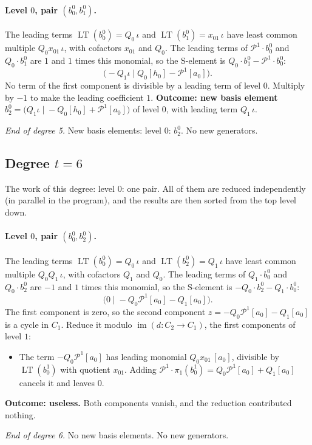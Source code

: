 \documentclass[11pt]{article}
\renewcommand{\P}{\mathcal{P}}
\DeclareMathOperator{\LT}{LT}
\begin{document}
\paragraph{Level $0$, pair $(b^{0}_{0}, b^{0}_{1})$.} The leading terms $\LT(b^{0}_{0}) = Q_{0}\,\iota$ and $\LT(b^{0}_{1}) = x_{01}\,\iota$ have least common multiple $Q_{0}x_{01}\,\iota$, with cofactors $x_{01}$ and $Q_{0}$.
The leading terms of $\P^{1}\cdot b^{0}_{0}$ and $Q_{0}\cdot b^{0}_{1}$ are $1$ and $1$ times this monomial, so the S-element is $Q_{0}\cdot b^{0}_{1} - \P^{1}\cdot b^{0}_{0}$:
\[\bigl(-Q_{1}\iota \;\big|\; Q_{0}[h_0] - \P^{1}[a_0]\bigr).\]
No term of the first component is divisible by a leading term of level $0$.
Multiply by $-1$ to make the leading coefficient $1$.
\textbf{Outcome: new basis element} $b^{0}_{2} = \bigl(Q_{1}\iota \;\big|\; -Q_{0}[h_0] + \P^{1}[a_0]\bigr)$ of level $0$, with leading term $Q_{1}\,\iota$.
\medskip
\par\noindent\emph{End of degree 5.} New basis elements: level $0$: $b^{0}_{2}$. No new generators.
\subsection*{Degree $t = 6$}
\noindent The work of this degree: level $0$: one pair. All of them are reduced independently (in parallel in the program), and the results are then sorted from the top level down.
\medskip
\paragraph{Level $0$, pair $(b^{0}_{0}, b^{0}_{2})$.} The leading terms $\LT(b^{0}_{0}) = Q_{0}\,\iota$ and $\LT(b^{0}_{2}) = Q_{1}\,\iota$ have least common multiple $Q_{0}Q_{1}\,\iota$, with cofactors $Q_{1}$ and $Q_{0}$.
The leading terms of $Q_{1}\cdot b^{0}_{0}$ and $Q_{0}\cdot b^{0}_{2}$ are $-1$ and $1$ times this monomial, so the S-element is $-Q_{0}\cdot b^{0}_{2} - Q_{1}\cdot b^{0}_{0}$:
\[\bigl(0 \;\big|\; -Q_{0}\P^{1}[a_0] - Q_{1}[a_0]\bigr).\]
The first component is zero, so the second component $z = -Q_{0}\P^{1}[a_0] - Q_{1}[a_0]$ is a cycle in $C_{1}$.
Reduce it modulo $\operatorname{im}(d\colon C_{2}\to C_{1})$, the first components of level $1$:
\begin{itemize}
\item The term $-Q_{0}\P^{1}[a_0]$ has leading monomial $Q_{0}x_{01}\,[a_0]$, divisible by $\LT(b^{1}_{0})$ with quotient $x_{01}$. Adding $\P^{1}\cdot \pi_1(b^{1}_{0}) = Q_{0}\P^{1}[a_0] + Q_{1}[a_0]$ cancels it and leaves $0$.
\end{itemize}
\textbf{Outcome: useless.} Both components vanish, and the reduction contributed nothing.
\medskip
\par\noindent\emph{End of degree 6.} No new basis elements. No new generators.
\end{document}
